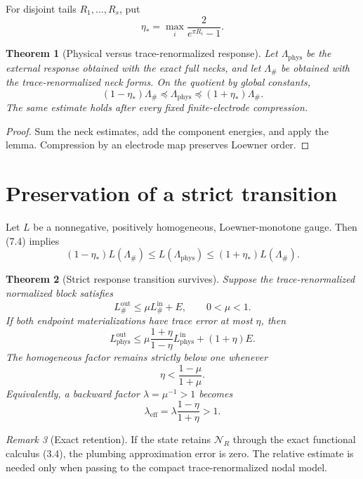 \documentclass[10pt]{article}
\newtheorem{theorem}{Theorem}[section]
\theoremstyle{definition}
\theoremstyle{remark}
\newtheorem{remark}[theorem]{Remark}
\begin{document}
For disjoint tails $R_1,\ldots,R_s$, put
\[
 \eta_*=\max_i\frac{2}{e^{\pi R_i}-1}.
\tag{7.3}
\]

\begin{theorem}[Physical versus trace-renormalized response]
Let $\Lambda_{\mathrm{phys}}$ be the external response obtained with the exact
full necks, and let $\Lambda_{\#}$ be obtained with the trace-renormalized neck
forms. On the quotient by global constants,
\[
 \boxed{
 (1-\eta_*)\Lambda_{\#}
 \preceq\Lambda_{\mathrm{phys}}
 \preceq(1+\eta_*)\Lambda_{\#}.}
\tag{7.4}
\]
The same estimate holds after every fixed finite-electrode compression.
\end{theorem}

\begin{proof}
Sum the neck estimates, add the component energies, and apply the lemma.
Compression by an electrode map preserves Loewner order.
\end{proof}

\section{Preservation of a strict transition}

Let $L$ be a nonnegative, positively homogeneous, Loewner-monotone gauge. Then
(7.4) implies
\[
 (1-\eta_*)L(\Lambda_{\#})
 \le L(\Lambda_{\mathrm{phys}})
 \le(1+\eta_*)L(\Lambda_{\#}).
\tag{8.1}
\]

\begin{theorem}[Strict response transition survives]
Suppose the trace-renormalized normalized block satisfies
\[
 L_{\#}^{\mathrm{out}}
 \le\mu L_{\#}^{\mathrm{in}}+E,
 \qquad0<\mu<1.
\tag{8.2}
\]
If both endpoint materializations have trace error at most $\eta$, then
\[
 L_{\mathrm{phys}}^{\mathrm{out}}
 \le
 \mu\frac{1+\eta}{1-\eta}
 L_{\mathrm{phys}}^{\mathrm{in}}
 +(1+\eta)E.
\tag{8.3}
\]
The homogeneous factor remains strictly below one whenever
\[
 \eta<\frac{1-\mu}{1+\mu}.
\tag{8.4}
\]
Equivalently, a backward factor $\lambda=\mu^{-1}>1$ becomes
\[
 \lambda_{\mathrm{eff}}
 =\lambda\frac{1-\eta}{1+\eta}>1.
\tag{8.5}
\]
\end{theorem}

\begin{remark}[Exact retention]
If the state retains $\mathcal N_R$ through the exact functional calculus
(3.4), the plumbing approximation error is zero. The relative estimate is
needed only when passing to the compact trace-renormalized nodal model.
\end{remark}
\end{document}
